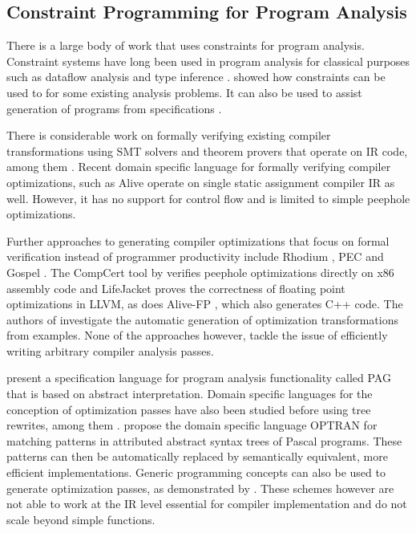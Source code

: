 \subsection{Constraint Programming for Program Analysis}

    There is a large body of work that uses constraints for program analysis.
    Constraint systems have long been used in program analysis for classical
    purposes such as dataflow analysis and type inference
    \citep{Aiken:1999:ISC:339853.339897}.
    \citet{Gulwani:2008:PAC:1375581.1375616} showed how constraints can be
    used to for some  existing analysis problems.
    It can also be used to assist generation of programs from specifications
    \citep{Srivastava:2010:PVP:1707801.1706337}.

    There is considerable work on formally verifying existing compiler
    transformations using SMT solvers and theorem provers that operate on IR
    code, among them \cite{Zhao:2012:FLI:2103656.2103709}.
    Recent domain specific language for formally verifying compiler
    optimizations, such as Alive \cite{Lopes:2015:PCP:2737924.2737965} operate
    on single static assignment compiler IR as well.
    However, it has no support for control flow and is limited to simple
    peephole optimizations.

    Further approaches to generating compiler optimizations that focus on formal
    verification instead of programmer productivity include Rhodium
    \citep{Lerner:2005:ASP:1040305.1040335}, PEC
    \citep{Kundu:2009:POC:1543135.1542513} and Gospel
    \citep{Whitfield:1997:AEC:267959.267960}.
    The CompCert tool by \citet{Mullen:2016:VPO:2908080.2908109} verifies peephole
    optimizations directly on x86 assembly code and LifeJacket
    \cite{Notzli:2016:LVP:2931021.2931024} proves the correctness of floating
    point optimizations in LLVM, as does Alive-FP \cite{Menendez2016}, which
    also generates C++ code.
    The authors of \cite{Tate:2010:GCO:1706299.1706345} investigate the
    automatic generation of optimization transformations from examples.
    None of the approaches however, tackle the issue of efficiently writing
    arbitrary compiler analysis passes.

    \citet{Martin1998} present a specification language for program analysis
    functionality called PAG that is based on abstract interpretation.
    Domain specific languages for the conception of optimization passes have
    also been studied before using tree rewrites, among them
    \citet{Olmos:2005:CSD:2136624.2136643}.
    \citet{Lipps1989} propose the domain specific language OPTRAN for matching
    patterns in attributed abstract syntax trees of Pascal programs.
    These patterns can then be automatically replaced by semantically
    equivalent, more efficient implementations. 
    Generic programming
    concepts can also be used to generate optimization passes, as
    demonstrated by \cite{Willcock:2009:RGP:1621607.1621611}.  These
    schemes however are not able to work at the IR level essential for
    compiler implementation and do not scale beyond simple functions.


